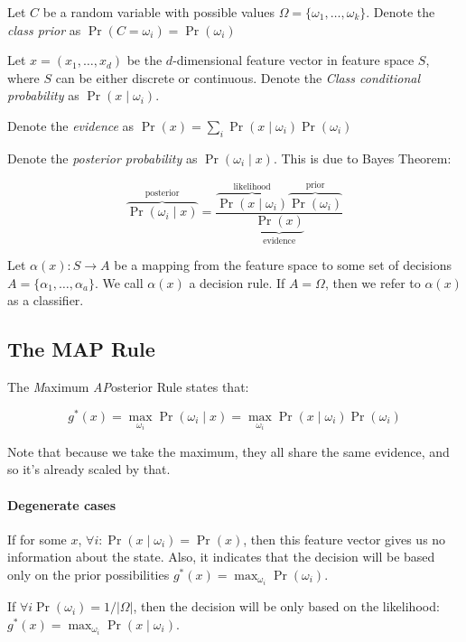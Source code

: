\documentclass{idc_msc}
\begin{document}
Let \(C\) be a random variable with possible values \(\Omega = \{\omega_1,\ldots,\omega_k\}\).
Denote the \emph{class prior} as \(\Pr(C = \omega_i) = \Pr(\omega_i)\)

Let \(x = (x_1, \ldots, x_d)\) be the \(d\)-dimensional feature vector in feature space \(S\), where \(S\) can be either discrete or continuous.
Denote the \emph{Class conditional probability} as \(\Pr(x \mid \omega_i)\).

Denote the \emph{evidence} as \(\Pr(x) = \sum_i \Pr(x \mid \omega_i) \Pr(\omega_i)\)

Denote the \emph{posterior probability} as \(\Pr(\omega_i \mid x)\).
This is due to Bayes Theorem:

\[
  \overbrace{\Pr(\omega_i\mid x)}^{\text{posterior}} = \frac{\overbrace{\Pr(x \mid \omega_i)}^{\text{likelihood}}\overbrace{\Pr(\omega_i)}^{\text{prior}}}{\underbrace{\Pr(x)}_{\text{evidence}}}
\]

Let \(\alpha(x) : S \to A\) be a mapping from the feature space to some set of decisions \(A = \{\alpha_1, \ldots, \alpha_a\}\).
We call \(\alpha(x)\) a decision rule.
If \(A = \Omega\), then we refer to \(\alpha(x)\) as a classifier.

\subsection{The MAP Rule}

The \emph{M}aximum \emph{A}\emph{P}osterior Rule states that:

\[g^*(x) = \max_{\omega_i} \Pr(\omega_i \mid x) = \max_{\omega_i} \Pr(x \mid \omega_i) \Pr(\omega_i)\]

Note that because we take the maximum, they all share the same evidence, and so it's already scaled by that.

\paragraph{Degenerate cases}

If for some \(x\), \(\forall i : \Pr(x \mid \omega_i) = \Pr(x)\), then this feature vector gives us no information about the state.
Also, it indicates that the decision will be based only on the prior possibilities \(g^*(x) = \max_{\omega_i} \Pr(\omega_i)\).

If \(\forall i \Pr(\omega_i) = 1 / |\Omega|\), then the decision will be only based on the likelihood: \(g^*(x) = \max_{\omega_i} \Pr(x \mid \omega_i)\).
\end{document}
